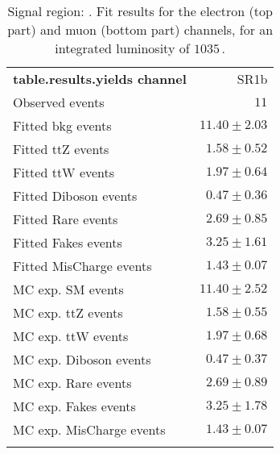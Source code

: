 

\begin{table}
\begin{center}
\setlength{\tabcolsep}{0.0pc}
{\small
\begin{tabular*}{\textwidth}{@{\extracolsep{\fill}}lr}
\noalign{\smallskip}\hline\noalign{\smallskip}
{\bf table.results.yields channel}           & SR1b              \\[-0.05cm]
\noalign{\smallskip}\hline\noalign{\smallskip}
Observed events          & $11$                    \\
\noalign{\smallskip}\hline\noalign{\smallskip}
Fitted bkg events         & $11.40 \pm 2.03$              \\
\noalign{\smallskip}\hline\noalign{\smallskip}
        Fitted ttZ events         & $1.58 \pm 0.52$              \\
        Fitted ttW events         & $1.97 \pm 0.64$              \\
        Fitted Diboson events         & $0.47 \pm 0.36$              \\
        Fitted Rare events         & $2.69 \pm 0.85$              \\
        Fitted Fakes events         & $3.25 \pm 1.61$              \\
        Fitted MisCharge events         & $1.43 \pm 0.07$              \\
 \noalign{\smallskip}\hline\noalign{\smallskip}
MC exp. SM events              & $11.40 \pm 2.52$              \\
\noalign{\smallskip}\hline\noalign{\smallskip}
        MC exp. ttZ events         & $1.58 \pm 0.55$              \\
        MC exp. ttW events         & $1.97 \pm 0.68$              \\
        MC exp. Diboson events         & $0.47 \pm 0.37$              \\
        MC exp. Rare events         & $2.69 \pm 0.89$              \\
        MC exp. Fakes events         & $3.25 \pm 1.78$              \\
        MC exp. MisCharge events         & $1.43 \pm 0.07$              \\
\noalign{\smallskip}\hline\noalign{\smallskip}
\end{tabular*}
}
\end{center}
\caption{Signal region: . Fit results for the electron (top part) and muon (bottom part) channels, for an integrated luminosity of $1035$\,\ipb.
}
\end{table}

